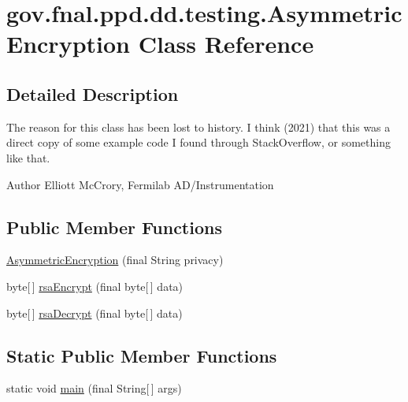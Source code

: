 \hypertarget{classgov_1_1fnal_1_1ppd_1_1dd_1_1testing_1_1AsymmetricEncryption}{\section{gov.\-fnal.\-ppd.\-dd.\-testing.\-Asymmetric\-Encryption Class Reference}
\label{classgov_1_1fnal_1_1ppd_1_1dd_1_1testing_1_1AsymmetricEncryption}
}


\subsection{Detailed Description}
The reason for this class has been lost to history. I think (2021) that this was a direct copy of some example code I found through Stack\-Overflow, or something like that.

\begin{DoxyAuthor}{Author}
Elliott Mc\-Crory, Fermilab A\-D/\-Instrumentation 
\end{DoxyAuthor}
\subsection*{Public Member Functions}
\begin{DoxyCompactItemize}
\item 
\hyperlink{classgov_1_1fnal_1_1ppd_1_1dd_1_1testing_1_1AsymmetricEncryption_a5272341af392c74c910ce0874523defe}{Asymmetric\-Encryption} (final String privacy)
\item 
byte\mbox{[}$\,$\mbox{]} \hyperlink{classgov_1_1fnal_1_1ppd_1_1dd_1_1testing_1_1AsymmetricEncryption_a3d19fa6b578aead37afe4328881fe467}{rsa\-Encrypt} (final byte\mbox{[}$\,$\mbox{]} data)
\item 
byte\mbox{[}$\,$\mbox{]} \hyperlink{classgov_1_1fnal_1_1ppd_1_1dd_1_1testing_1_1AsymmetricEncryption_ae076c4919f79815cebae79ca1b62066a}{rsa\-Decrypt} (final byte\mbox{[}$\,$\mbox{]} data)
\end{DoxyCompactItemize}
\subsection*{Static Public Member Functions}
\begin{DoxyCompactItemize}
\item 
static void \hyperlink{classgov_1_1fnal_1_1ppd_1_1dd_1_1testing_1_1AsymmetricEncryption_ae24fff0243749113cb3c1c4c348b8cc3}{main} (final String\mbox{[}$\,$\mbox{]} args)
\end{DoxyCompactItemize}



